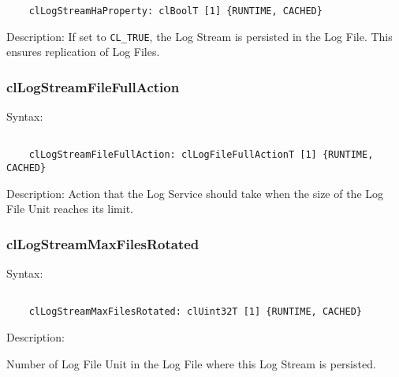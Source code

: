 \begin{flushleft}
\begin{Desc}
\begin{verbatim}
	clLogStreamHaProperty: clBoolT [1] {RUNTIME, CACHED}
	\end{verbatim}
	\normalsize
\end{Desc}

\begin{Desc}
\item[Description:]
If set to {\tt{CL\_\-TRUE}}, the Log Stream is persisted in the Log File. This ensures replication of Log Files.
\end{Desc}



\subsubsection{clLogStreamFileFullAction}
\begin{Desc}
\item[Syntax:]
\footnotesize\begin{verbatim}        	

	clLogStreamFileFullAction: clLogFileFullActionT [1] {RUNTIME, CACHED}
	\end{verbatim}
	\normalsize
\end{Desc}

 \begin{Desc}
 \item[Description:]
Action that the Log Service should take when the size of the Log File Unit reaches its limit.
\end{Desc}


\subsubsection{clLogStreamMaxFilesRotated}
\begin{Desc}
\item[Syntax:]
\end{Desc}
\footnotesize\begin{verbatim}        	

	clLogStreamMaxFilesRotated: clUint32T [1] {RUNTIME, CACHED}
	\end{verbatim}
	\normalsize

 \begin{Desc}
 \item[Description:]
\end{Desc}
Number of Log File Unit in the Log File where this Log Stream is persisted.




\end{flushleft}
